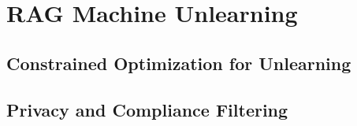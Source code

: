 \section{RAG Machine Unlearning}
\subsection{Constrained Optimization for Unlearning}
\subsection{Privacy and Compliance Filtering}
